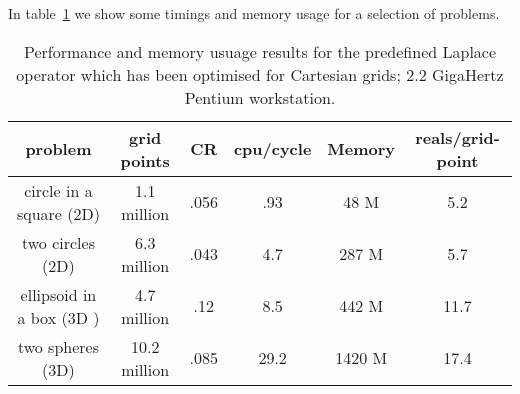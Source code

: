 In table~\ref{tab:performance} we show some timings and memory usage for a selection of
problems.

\begin{table}[hbt]
\begin{center}
\begin{tabular}{|c|c|c|c|c|c|} \hline 
  problem                      &  grid points & CR  & cpu/cycle  & Memory  & reals/grid-point\\ \hline\hline 
  circle in a square (2D)      & 1.1 million  &.056 &  .93       &  48 M   &    5.2  \\
  two circles  (2D)            & 6.3 million  &.043 &  4.7       & 287 M   &    5.7  \\
  ellipsoid in a box (3D )     & 4.7 million  &.12  &  8.5       & 442 M   &   11.7 \\
  two spheres (3D)             &10.2 million  &.085 & 29.2       &1420 M   &   17.4 \\ \hline
\end{tabular}
\end{center}
\caption{Performance and memory usuage results for the 
predefined Laplace operator which has been optimised for Cartesian grids; 2.2 GigaHertz Pentium workstation.}
 \label{tab:performance} 
\end{table}

